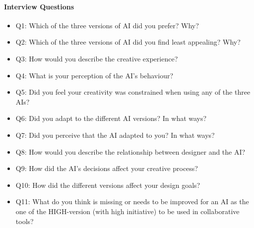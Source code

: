 \paragraph{Interview Questions}

\begin{itemize}
    \item Q1: Which of the three versions of AI did you prefer?
Why?

\item Q2: Which of the three versions of AI did you find least appealing? 
Why?


\item Q3:  How would you describe the creative experience?


\item Q4: What is your perception of the AI’s behaviour? 


\item Q5: Did you feel your creativity was constrained when using any of the three AIs?


\item Q6: Did you adapt to the different AI versions? 
In what ways?


\item Q7: Did you perceive that the AI adapted to you?
In what ways?


\item Q8: How would you describe the relationship between designer and the AI?


\item Q9: How did the AI’s decisions affect your creative process?


\item Q10: How did the different versions affect your design goals?


\item Q11: What do you think is missing or needs to be improved for an AI as the one of the HIGH-version (with high initiative) to be used in collaborative tools?
\end{itemize}

